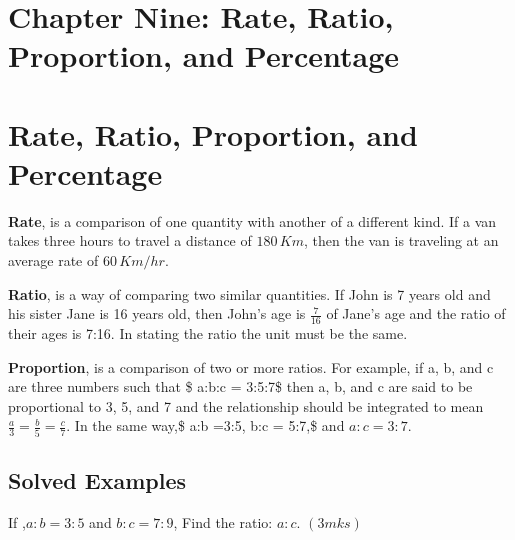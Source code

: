 \documentclass[
  a4paperpaper,
]{scrbook}
\begin{document}

\chapter{Chapter Nine: Rate, Ratio, Proportion, and
Percentage}\label{chapter-nine-rate-ratio-proportion-and-percentage}


\chapter*{Rate, Ratio, Proportion, and
Percentage}\label{rate-ratio-proportion-and-percentage}


\textbf{Rate}, is a comparison of one quantity with another of a
different kind. If a van takes three hours to travel a distance of
\(180 \,Km\), then the van is traveling at an average rate of
\(60 \,Km/hr\).

\textbf{Ratio}, is a way of comparing two similar quantities. If John is
7 years old and his sister Jane is 16 years old, then John's age is
\(\frac{7}{16}\) of Jane's age and the ratio of their ages is 7:16. In
stating the ratio the unit must be the same.

\textbf{Proportion}, is a comparison of two or more ratios. For example,
if a, b, and c are three numbers such that \$ a:b:c = 3:5:7\$ then a, b,
and c are said to be proportional to 3, 5, and 7 and the relationship
should be integrated to mean \(\frac{a}{3}=\frac{b}{5}=\frac{c}{7}\). In
the same way,\$ a:b =3:5, b:c = 5:7,\$ and \(a:c = 3:7\).

\section{Solved Examples}\label{solved-examples-7}

\begin{tcolorbox}[enhanced jigsaw, left=2mm, colframe=quarto-callout-note-color-frame, toptitle=1mm, opacitybacktitle=0.6, rightrule=.15mm, colbacktitle=quarto-callout-note-color!10!white, colback=white, arc=.35mm, breakable, leftrule=.75mm, bottomtitle=1mm, bottomrule=.15mm, title=\textcolor{quarto-callout-note-color}{\faInfo}\hspace{0.5em}{Example 1}, titlerule=0mm, coltitle=black, toprule=.15mm, opacityback=0]

If ,\(a:b=3:5\) and \(b:c=7:9\), Find the ratio: \(a:c\).
\hspace{6.5 cm} \((3mks)\)

\end{tcolorbox}
\end{document}
